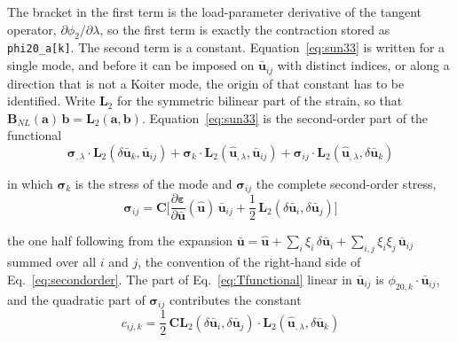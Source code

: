 \documentclass[11pt,a4paper]{article}
\begin{document}
The bracket in the first term is the load-parameter derivative of the tangent
operator, $\partial \phi_2/\partial\lambda$, so the first term is exactly the
contraction stored as \texttt{phi20\_a[k]}.  The second term is a constant.
Equation~\ref{eq:sun33} is written for a single mode, and before it can be
imposed on $\boldsymbol{\bar{u}}_{ij}$ with distinct indices, or along a
direction that is not a Koiter mode, the origin of that constant has to be
identified.  Write $\boldsymbol{L}_2$ for the symmetric bilinear part of the
strain, so that $\boldsymbol{B}_{NL}(\boldsymbol{a})\,\boldsymbol{b} =
\boldsymbol{L}_2(\boldsymbol{a},\boldsymbol{b})$.  Equation~\ref{eq:sun33} is
the second-order part of the functional
\begin{equation}\label{eq:Tfunctional}
	\boldsymbol{\sigma}_{,\lambda}\cdot
	  \boldsymbol{L}_2(\delta\boldsymbol{\bar{u}}_k,\boldsymbol{\bar{u}}_{ij})
	+ \boldsymbol{\sigma}_k\cdot
	  \boldsymbol{L}_2(\boldsymbol{\hat{u}}_{,\lambda},\boldsymbol{\bar{u}}_{ij})
	+ \boldsymbol{\sigma}_{ij}\cdot
	  \boldsymbol{L}_2(\boldsymbol{\hat{u}}_{,\lambda},\delta\boldsymbol{\bar{u}}_k)
\end{equation}

\noindent in which $\boldsymbol{\sigma}_k$ is the stress of the mode and
$\boldsymbol{\sigma}_{ij}$ the complete second-order stress,
\begin{equation}
	\boldsymbol{\sigma}_{ij} = \boldsymbol{C}\Big[
	  \frac{\partial\boldsymbol{\varepsilon}}{\partial\boldsymbol{\bar{u}}}
	  (\boldsymbol{\hat{u}})\,\boldsymbol{\bar{u}}_{ij}
	  + \frac{1}{2}\,\boldsymbol{L}_2(\delta\boldsymbol{\bar{u}}_i,
	                               \delta\boldsymbol{\bar{u}}_j)\Big]
\end{equation}

\noindent the one half following from the expansion
$\boldsymbol{\bar{u}} = \boldsymbol{\hat{u}}
+ \sum_i\xi_i\,\delta\boldsymbol{\bar{u}}_i
+ \sum_{i,j}\xi_i\xi_j\,\boldsymbol{\bar{u}}_{ij}$ summed over all $i$ and $j$,
the convention of the right-hand side of Eq.~\ref{eq:secondorder}.  The part
of Eq.~\ref{eq:Tfunctional} linear in $\boldsymbol{\bar{u}}_{ij}$ is
$\phi_{20,k}\cdot\boldsymbol{\bar{u}}_{ij}$, and the quadratic part of
$\boldsymbol{\sigma}_{ij}$ contributes the constant
\begin{equation}\label{eq:cconst}
	c_{ij,k} = \frac{1}{2}\,
	  \boldsymbol{C}\boldsymbol{L}_2(\delta\boldsymbol{\bar{u}}_i,
	                                 \delta\boldsymbol{\bar{u}}_j)
	  \cdot\boldsymbol{L}_2(\boldsymbol{\hat{u}}_{,\lambda},
	                        \delta\boldsymbol{\bar{u}}_k)
\end{equation}
\end{document}
